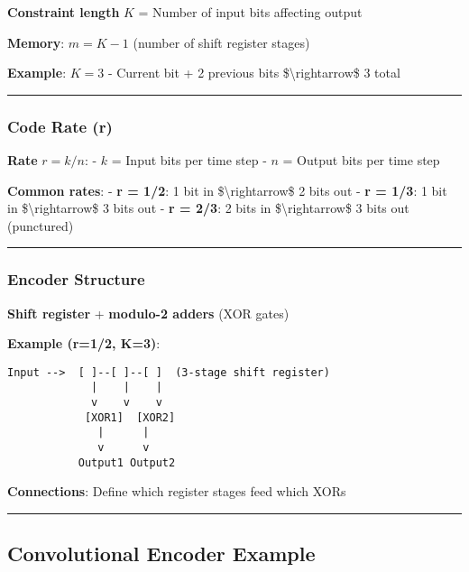 \textbf{Constraint length} \(K\) = Number of input bits affecting output

\textbf{Memory}: \(m = K - 1\) (number of shift register stages)

\textbf{Example}: \(K = 3\) - Current bit + 2 previous bits
\$\textbackslash rightarrow\$ 3 total

\begin{center}\rule{0.5\linewidth}{0.5pt}\end{center}

\subsubsection{Code Rate (r)}\label{code-rate-r}

\textbf{Rate} \(r = k/n\): - \(k\) = Input bits per time step - \(n\) =
Output bits per time step

\textbf{Common rates}: - \textbf{r = 1/2}: 1 bit in
\$\textbackslash rightarrow\$ 2 bits out - \textbf{r = 1/3}: 1 bit in
\$\textbackslash rightarrow\$ 3 bits out - \textbf{r = 2/3}: 2 bits in
\$\textbackslash rightarrow\$ 3 bits out (punctured)

\begin{center}\rule{0.5\linewidth}{0.5pt}\end{center}

\subsubsection{Encoder Structure}\label{encoder-structure}

\textbf{Shift register} + \textbf{modulo-2 adders} (XOR gates)

\textbf{Example (r=1/2, K=3)}:

\begin{verbatim}
Input -->  [ ]--[ ]--[ ]  (3-stage shift register)
             |    |    |
             v    v    v
            [XOR1]  [XOR2]
              |      |
              v      v
           Output1 Output2
\end{verbatim}

\textbf{Connections}: Define which register stages feed which XORs

\begin{center}\rule{0.5\linewidth}{0.5pt}\end{center}

\subsection{Convolutional Encoder
Example}\label{convolutional-encoder-example}

